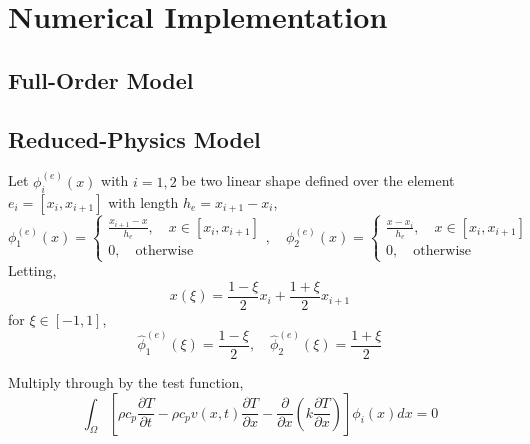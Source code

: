 \appendix

\section{Numerical Implementation}\label{app_implementation}

\subsection{Full-Order Model}

\subsection{Reduced-Physics Model}

Let $\phi^{(e)}_i(x)$ with $i=1,2$ be two linear shape defined over the element $e_i=[x_{i},x_{i+1}]$ with length $h_e=x_{i+1} - x_i$,
\begin{equation}
    \phi^{(e)}_1(x) = \left\{\begin{matrix}
        \frac{x_{i+1} - x}{h_e},\quad x\in[x_i,x_{i+1}]\\
        0, \quad \text{otherwise}
    \end{matrix}\right.,\quad\phi^{(e)}_2(x) = \left\{\begin{matrix}
        \frac{x - x_i}{h_e},\quad x\in[x_i,x_{i+1}]\\
        0, \quad \text{otherwise}
    \end{matrix}\right.
\end{equation}
Letting,
\[
    x(\xi) = \frac{1-\xi}{2}x_i + \frac{1 + \xi}{2}x_{i+1}
\]
for $\xi\in[-1,1]$,
\begin{equation}
    \hat{\phi}_1^{(e)}(\xi) = \frac{1 - \xi}{2},\quad \hat{\phi}_2^{(e)}(\xi) = \frac{1 + \xi}{2}
\end{equation}

Multiply through by the test function,
\begin{equation}
    \int_{\Omega}\left[\rho c_p\frac{\partial T}{\partial t} - \rho c_p v(x,t)\frac{\partial T}{\partial x} - \frac{\partial}{\partial x}\left(k\frac{\partial T}{\partial x}\right)\right]\phi_i(x)dx = 0
\end{equation}

